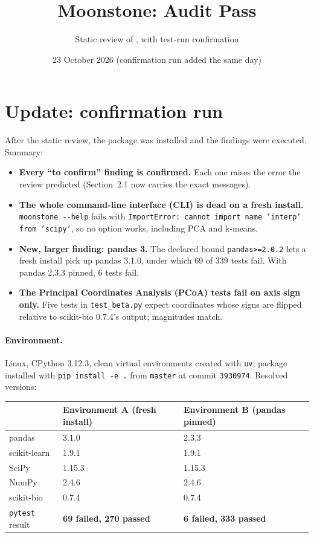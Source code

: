\documentclass[11pt,a4paper]{article}
\title{Moonstone: Audit Pass}
\author{Static review of \code{motleystate/moonstone}, with test-run confirmation}
\date{23 October 2026 (confirmation run added the same day)}
\newcommand{\code}[1]{\texttt{\small #1}}
\begin{document}
\maketitle

\section*{Update: confirmation run}

After the static review, the package was installed and the findings were executed. Summary:

\begin{itemize}
  \item \textbf{Every ``to confirm'' finding is confirmed.} Each one raises the error the review predicted
        (Section~2.1 now carries the exact messages).
  \item \textbf{The whole command-line interface (CLI) is dead on a fresh install.} \code{moonstone -{}-help} fails with
        \code{ImportError: cannot import name 'interp' from 'scipy'}, so no option works, including PCA and k-means.
  \item \textbf{New, larger finding: pandas 3.} The declared bound \code{pandas>=2.0.2} lets a fresh install pick up
        pandas 3.1.0, under which 69 of 339 tests fail. With pandas 2.3.3 pinned, 6 tests fail.
  \item \textbf{The Principal Coordinates Analysis (PCoA) tests fail on axis sign only.} Five tests in
        \code{test\_beta.py} expect coordinates whose signs are flipped relative to scikit-bio 0.7.4's output; magnitudes match.
\end{itemize}

\paragraph{Environment.} Linux, CPython 3.12.3, clean virtual environments created with \code{uv}, package installed with
\code{pip install -e .} from \code{master} at commit \code{3930974}. Resolved versions:

\begin{center}
\begin{tabular}{@{}lll@{}}
\toprule
 & \textbf{Environment A (fresh install)} & \textbf{Environment B (pandas pinned)}\\
\midrule
pandas & 3.1.0 & 2.3.3\\
scikit-learn & 1.9.1 & 1.9.1\\
SciPy & 1.15.3 & 1.15.3\\
NumPy & 2.4.6 & 2.4.6\\
scikit-bio & 0.7.4 & 0.7.4\\
\midrule
\code{pytest} result & \textbf{69 failed, 270 passed} & \textbf{6 failed, 333 passed}\\
\bottomrule
\end{tabular}
\end{center}
\end{document}
